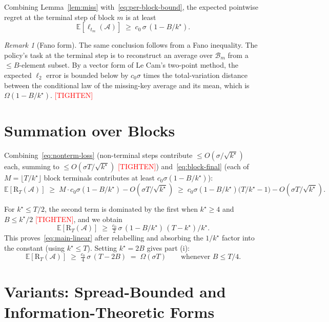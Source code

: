 \documentclass{article}
\theoremstyle{definition}
\theoremstyle{remark}
\newtheorem{remark}[theorem]{Remark}
\newcommand{\E}{\mathbb{E}}
\newcommand{\A}{\mathcal{A}}
\newcommand{\Bset}{\mathcal{B}}
\newcommand{\Reg}{\mathrm{R}}
\newcommand{\tighten}{\textcolor{red}{[TIGHTEN]}}
\begin{document}
Combining Lemma~\ref{lem:miss} with~\eqref{eq:per-block-bound}, the expected pointwise regret at the terminal step of block $m$ is at least
\begin{equation}\label{eq:block-final}
\E[\ell_{t_m}(\A)] \;\ge\; c_0\,\sigma\,(1-B/k^\star).
\end{equation}

\begin{remark}[Fano form]
The same conclusion follows from a Fano inequality. The policy's task at the terminal step is to reconstruct an average over $\Bset_m$ from a $\le B$-element subset. By a vector form of Le Cam's two-point method, the expected $\ell_2$ error is bounded below by $c_0\sigma$ times the total-variation distance between the conditional law of the missing-key average and its mean, which is $\Omega(1-B/k^\star)$. \tighten
\end{remark}

\section{Summation over Blocks}
\label{sec:sum}

Combining~\eqref{eq:nonterm-loss} (non-terminal steps contribute $\le O(\sigma/\sqrt{k^\star})$ each, summing to $\le O(\sigma T/\sqrt{k^\star})$ \tighten) and~\eqref{eq:block-final} (each of $M=\lfloor T/k^\star\rfloor$ block terminals contributes at least $c_0\sigma(1-B/k^\star)$):
\begin{equation}
\E[\Reg_T(\A)]
\;\ge\; M\cdot c_0\sigma(1-B/k^\star) - O(\sigma T/\sqrt{k^\star})
\;\ge\; c_0\sigma(1-B/k^\star)\bigl(T/k^\star-1\bigr) - O(\sigma T/\sqrt{k^\star}).
\end{equation}

For $k^\star\le T/2$, the second term is dominated by the first when $k^\star\ge 4$ and $B\le k^\star/2$ \tighten, and we obtain
\begin{equation}\label{eq:sum-bound}
\E[\Reg_T(\A)] \;\ge\; \tfrac{c_0}{2}\,\sigma\,(1-B/k^\star)\,(T-k^\star)/k^\star.
\end{equation}
This proves~\eqref{eq:main-linear} after relabelling and absorbing the $1/k^\star$ factor into the constant (using $k^\star\le T$). Setting $k^\star=2B$ gives part (i):
\[
\E[\Reg_T(\A)] \;\ge\; \tfrac{c_0}{4}\,\sigma\,(T-2B) \;=\;\Omega(\sigma T)\qquad\text{whenever }B\le T/4.
\]

\section{Variants: Spread-Bounded and Information-Theoretic Forms}
\label{sec:variants}
\end{document}

